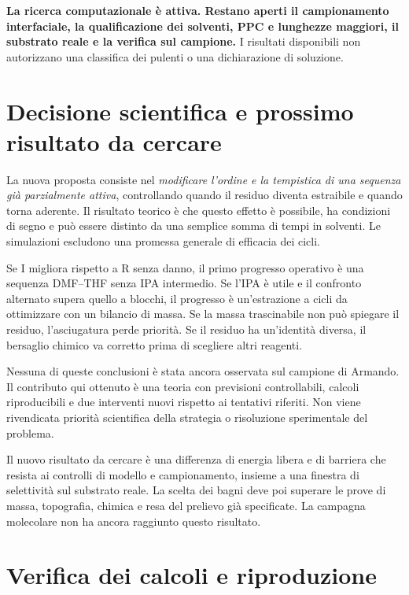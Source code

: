 \documentclass[11pt,reqno]{amsart}
\numberwithin{equation}{section}
\begin{document}
\textbf{La ricerca computazionale \`e attiva. Restano aperti il
campionamento interfaciale, la qualificazione dei solventi,
PPC e lunghezze maggiori, il substrato reale e la verifica sul campione.}
I risultati disponibili non autorizzano una classifica dei pulenti
o una dichiarazione di soluzione.

\section{Decisione scientifica e prossimo risultato da cercare}

La nuova proposta consiste nel \emph{modificare l'ordine e la
tempistica di una sequenza gi\`a parzialmente attiva}, controllando
quando il residuo diventa estraibile e quando torna aderente.
Il risultato teorico \`e che questo effetto \`e possibile, ha
condizioni di segno e pu\`o essere distinto da una semplice
somma di tempi in solventi. Le simulazioni escludono una
promessa generale di efficacia dei cicli.

Se I migliora rispetto a R senza danno, il primo progresso
operativo \`e una sequenza DMF--THF senza IPA intermedio.
Se l'IPA \`e utile e il confronto alternato supera quello
a blocchi, il progresso \`e un'estrazione a cicli da ottimizzare
con un bilancio di massa. Se la massa trascinabile non pu\`o
spiegare il residuo, l'asciugatura perde priorit\`a. Se il
residuo ha un'identit\`a diversa, il bersaglio chimico va
corretto prima di scegliere altri reagenti.

Nessuna di queste conclusioni \`e stata ancora osservata sul
campione di Armando. Il contributo qui ottenuto \`e una teoria
con previsioni controllabili, calcoli riproducibili e due
interventi nuovi rispetto ai tentativi riferiti. Non viene
rivendicata priorit\`a scientifica della strategia o risoluzione
sperimentale del problema.

Il nuovo risultato da cercare \`e una differenza di energia libera
e di barriera che resista ai controlli di modello e campionamento,
insieme a una finestra di selettivit\`a sul substrato reale. La scelta
dei bagni deve poi superare le prove di massa, topografia, chimica
e resa del prelievo gi\`a specificate. La campagna molecolare non
ha ancora raggiunto questo risultato.

\appendix
\section{Verifica dei calcoli e riproduzione}
\end{document}
